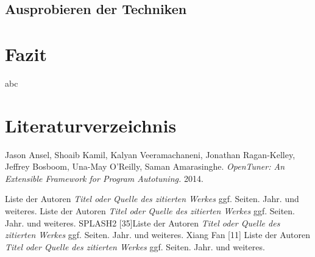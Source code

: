 \documentclass[a4paper,11pt]{scrartcl}
\begin{document}











%

\subsection{Ausprobieren der Techniken}


\section{Fazit}
abc


\section{Literaturverzeichnis}

\begin{thebibliography}{9}
   
  
     Jason Ansel, Shoaib Kamil, Kalyan Veeramachaneni, Jonathan Ragan-Kelley, Jeffrey Bosboom, Una-May O'Reilly, Saman Amarasinghe. \emph{OpenTuner: An Extensible Framework for Program Autotuning.}
    2014.
   
 Liste der Autoren \emph{Titel oder Quelle des zitierten Werkes} ggf. Seiten.
    Jahr. und weiteres.
 Liste der Autoren \emph{Titel oder Quelle des zitierten Werkes} ggf. Seiten.
    Jahr. und weiteres.
 SPLASH2 [35]Liste der Autoren \emph{Titel oder Quelle des zitierten Werkes} ggf. Seiten.
    Jahr. und weiteres.
 Xiang Fan [11] Liste der Autoren \emph{Titel oder Quelle des zitierten Werkes} ggf. Seiten.
    Jahr. und weiteres.

\end{thebibliography}


\end{document}

